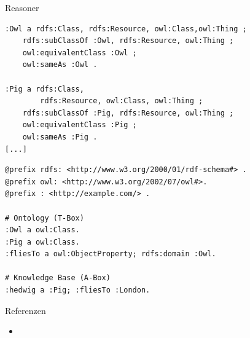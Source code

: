 \documentclass[14pt,aspectratio=1610]{beamer}
\begin{document}
\begin{frame}[fragile]{Reasoner}
\small
\begin{lstlisting}
:Owl a rdfs:Class, rdfs:Resource, owl:Class,owl:Thing ;
    rdfs:subClassOf :Owl, rdfs:Resource, owl:Thing ;
    owl:equivalentClass :Owl ;
    owl:sameAs :Owl .

:Pig a rdfs:Class,
        rdfs:Resource, owl:Class, owl:Thing ;
    rdfs:subClassOf :Pig, rdfs:Resource, owl:Thing ;
    owl:equivalentClass :Pig ;
    owl:sameAs :Pig .
[...]
\end{lstlisting}
\end{frame}

\begin{frame}[fragile]{}
\small
\begin{lstlisting}
@prefix rdfs: <http://www.w3.org/2000/01/rdf-schema#> .
@prefix owl: <http://www.w3.org/2002/07/owl#>.
@prefix : <http://example.com/> .

# Ontology (T-Box)
:Owl a owl:Class.
:Pig a owl:Class.
:fliesTo a owl:ObjectProperty; rdfs:domain :Owl.

# Knowledge Base (A-Box)
:hedwig a :Pig; :fliesTo :London.
\end{lstlisting}
\end{frame}

\begin{frame}{Referenzen}
\begin{itemize}
\item 
\end{itemize}

\end{frame}
\end{document}
